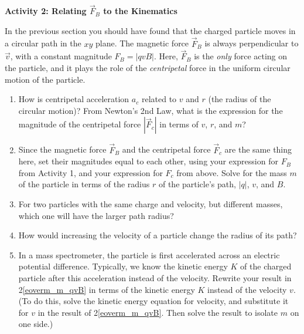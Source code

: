 \textbf{Activity 2: Relating $\vec F_B$ to the Kinematics}

In the previous section you should have found that the charged particle moves in a circular path in the $xy$ plane.  The magnetic force $\vec F_B$ is always perpendicular to $\vec v$,  with a constant magnitude $F_B = |qvB|$.  Here, $\vec F_B$ is the \textit{only} force acting on the particle, and it plays the role of the \textit{centripetal} force in the uniform circular motion of the particle.

\begin{enumerate}[labparts]


\item How is centripetal acceleration $a_c$ related to $v$ and $r$ (the radius of the
circular motion)? From Newton's 2nd Law, what is the expression for the magnitude of the centripetal force $|\vec F_c|$ in terms of $v$, $r$, and $m$?
\answerspace{15mm}


\item Since the magnetic force $\vec F_B$ and the centripetal force $\vec F_c$ are the same thing here, set their magnitudes equal to each other, using your expression for $F_B$ from Activity 1, and your expression for $F_c$ from above.  
Solve for the mass $m$ of the particle in terms of the radius $r$ of the particle's path,
$|q|$, $v$, and $B$. \label{eoverm_m_qvB}
\answerspace{35mm}


\item For two particles with the same charge and velocity, but different masses, which one will have the larger path radius?
\answerspace{0.5in}

\item How would increasing the velocity of a particle change the radius of its path?  \label{eoverm_predict_radius}
\answerspace{0.5in}

\item In a mass spectrometer, the particle is first accelerated
across an electric potential difference. Typically, we know the kinetic 
energy $K$ of the charged particle after this acceleration instead of the 
velocity. Rewrite your result in 2\ref{eoverm_m_qvB} in terms of the kinetic energy $K$ 
instead of the velocity $v$. (To do this, solve the kinetic energy equation for velocity, 
and substitute it for $v$ in the result of 2\ref{eoverm_m_qvB}. Then solve the result to isolate $m$ on one side.) \label{eoverm_m_qBrK}
\answerspace{30mm}


\end{enumerate}
